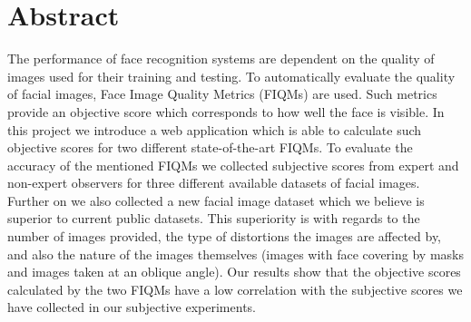 \chapter*{Abstract}
The performance of face recognition systems are dependent on the quality of images used for their training and testing. To automatically evaluate the quality of facial images, Face Image Quality Metrics (FIQMs) are used. Such metrics provide an objective score which corresponds to how well the face is visible. In this project we introduce a web application which is able to calculate such objective scores for two different state-of-the-art FIQMs. To evaluate the accuracy of the mentioned FIQMs we collected subjective scores from expert and non-expert observers for three different available datasets of facial images. Further on we also collected a new facial image dataset which we believe is superior to current public datasets. This superiority is with regards to the number of images provided, the type of distortions the images are affected by, and also the nature of the images themselves (images with face covering by masks and images taken at an oblique angle). Our results show that the objective scores calculated by the two FIQMs  have a low correlation with the subjective scores we have collected in our subjective experiments.



